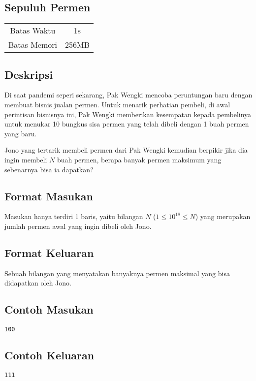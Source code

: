 \documentclass{article}
\begin{document}
\begin{center}
    \section*{Sepuluh Permen}

    \begin{tabular}{ | c c | }
        \hline
        Batas Waktu  & 1s \\    %
        Batas Memori & 256MB \\  %
        \hline
    \end{tabular}
\end{center}

\subsection*{Deskripsi}
Di saat pandemi seperi sekarang, Pak Wengki mencoba peruntungan baru dengan membuat bisnis jualan permen. Untuk menarik perhatian pembeli, di awal perintisan bisnisnya ini, Pak Wengki memberikan kesempatan kepada pembelinya untuk menukar 10 bungkus sisa permen yang telah dibeli dengan 1 buah permen yang baru. 

Jono yang tertarik membeli permen dari Pak Wengki kemudian berpikir jika dia ingin membeli $N$ buah permen, berapa banyak permen maksimum yang sebenarnya bisa ia dapatkan?

\subsection*{Format Masukan}

Masukan hanya terdiri 1 baris, yaitu bilangan $N$ ($1 \leq 10^{18} \leq N$) yang merupakan jumlah permen awal yang ingin dibeli oleh Jono.

\subsection*{Format Keluaran}

Sebuah bilangan yang menyatakan banyaknya permen maksimal yang bisa didapatkan oleh Jono.
\\

\begin{multicols}{2}
\subsection*{Contoh Masukan}
\begin{lstlisting}
100
\end{lstlisting}
\columnbreak
\subsection*{Contoh Keluaran}
\begin{lstlisting}
111
\end{lstlisting}
\vfill
\null
\end{multicols}


\pagebreak
\end{document}
